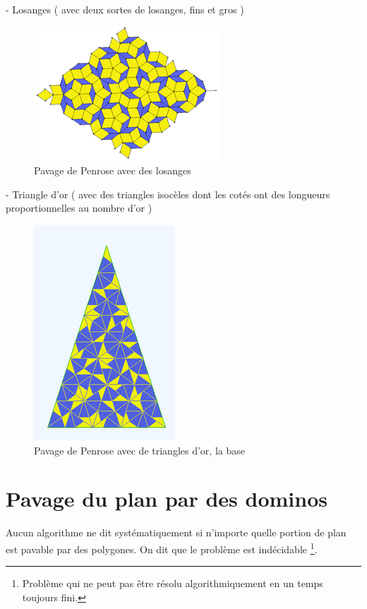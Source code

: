 \documentclass{article}
\begin{document}
- Losanges ( avec deux sortes de losanges, fins et gros )

\begin{figure} [h]
    \center
    \includegraphics [scale=0.5] {image/penrose_losange.png}
    \caption{Pavage de Penrose avec des losanges}
\end{figure}

- Triangle d’or ( avec des triangles isocèles dont les cotés ont des longueurs proportionnelles au nombre d’or )

\begin{figure} [h]
    \center
    \includegraphics [scale=0.5] {image/penrose_tri.png}
    \caption{Pavage de Penrose avec de triangles d'or, la base}
\end{figure}

\newpage

\section{Pavage du plan par des dominos}

Aucun algorithme ne dit systématiquement si n'importe quelle portion de plan est pavable par des polygones.
On dit que le problème est indécidable \footnote{Problème qui ne peut pas être résolu algorithmiquement en un temps toujours fini.}.
\end{document}
